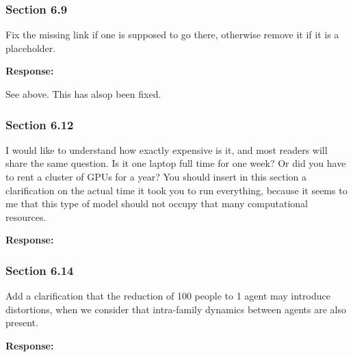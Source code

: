 \documentclass[11pt,a4paper]{article}
\begin{document}
\vspace{0.5cm}

\subsubsection*{Section 6.9}

\begin{reviewbox}
Fix the missing link if one is supposed to go there, otherwise remove it if it is a placeholder.
\end{reviewbox}

\textbf{Response:}

See above. This has alsop been fixed.

\vspace{0.5cm}

\subsubsection*{Section 6.12}

\begin{reviewbox}
I would like to understand how exactly expensive is it, and most readers will share the same question. Is it one laptop full time for one week? Or did you have to rent a cluster of GPUs for a year? You should insert in this section a clarification on the actual time it took you to run everything, because it seems to me that this type of model should not occupy that many computational resources.
\end{reviewbox}

\textbf{Response:}

\vspace{0.5cm}

\begin{updatebox}

\end{updatebox}

\vspace{0.5cm}

\subsubsection*{Section 6.14}

\begin{reviewbox}
Add a clarification that the reduction of 100 people to 1 agent may introduce distortions, when we consider that intra-family dynamics between agents are also present.
\end{reviewbox}

\textbf{Response:}
\end{document}
